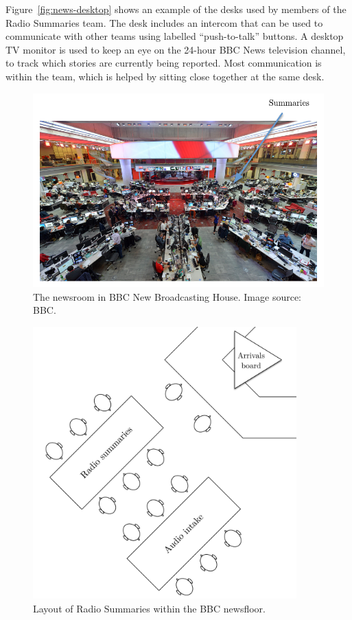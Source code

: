 Figure~\ref{fig:news-desktop} shows an example of the desks used by members of the Radio Summaries team. The desk
includes an intercom that can be used to communicate with other teams using labelled ``push-to-talk'' buttons. A
desktop TV monitor is used to keep an eye on the 24-hour BBC News television channel, to track which stories are
currently being reported. Most communication is within the team, which is helped by sitting close together at the same
desk.

\begin{figure}
  \centering
  \includegraphics[width=\columnwidth]{figs/newsroom.pdf}
  \caption{The newsroom in BBC New Broadcasting House. Image source: BBC.}
  \label{fig:newsroom}
\end{figure}

\begin{figure}
	\centering
	\includegraphics[width=4in]{figs/news-layout.pdf}
  \caption{Layout of Radio Summaries within the BBC newsfloor.}
	\label{fig:newsroom-layout}
\end{figure}

